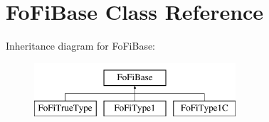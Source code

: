\hypertarget{class_fo_fi_base}{}\section{Fo\+Fi\+Base Class Reference}
\label{class_fo_fi_base}
Inheritance diagram for Fo\+Fi\+Base\+:\begin{figure}[H]
\begin{center}
\leavevmode
\includegraphics[height=2.000000cm]{class_fo_fi_base}
\end{center}
\end{figure}

